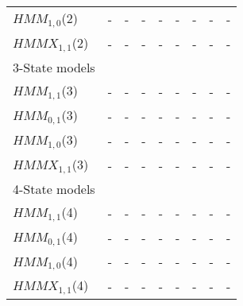 \documentclass[11pt,a4paper,oneside]{article}
\begin{document}
\begin{table}[h!]
\begin{tabular}{lrrrrrrrr}
\hspace{3mm}$HMM_{1,0}$(2) & - & - & - & - & - & - & - & -  \\

\hspace{3mm}$HMMX_{1,1}$(2)& - & - & - & - & - & - & - & -  \\

3-State models & & & & & & &  \\ 

\hspace{3mm}$HMM_{1,1}$(3) & - & - & - & - & - & - & - & -  \\

\hspace{3mm}$HMM_{0,1}$(3) & - & - & - & - & - & - & - & -  \\

\hspace{3mm}$HMM_{1,0}$(3) & - & - & - & - & - & - & - & -  \\

\hspace{3mm}$HMMX_{1,1}$(3)& - & - & - & - & - & - & - & -  \\

4-State models & & & & & & &  \\ 

\hspace{3mm}$HMM_{1,1}$(4) & - & - & - & - & - & - & - & - \\

\hspace{3mm}$HMM_{0,1}$(4) & - & - & - & - & - & - & - & - \\

\hspace{3mm}$HMM_{1,0}$(4) & - & - & - & - & - & - & - & - \\

\hspace{3mm}$HMMX_{1,1}$(4)& - & - & - & - & - & - & - & -  \\






\end{tabular}
\end{table}
\end{document}
